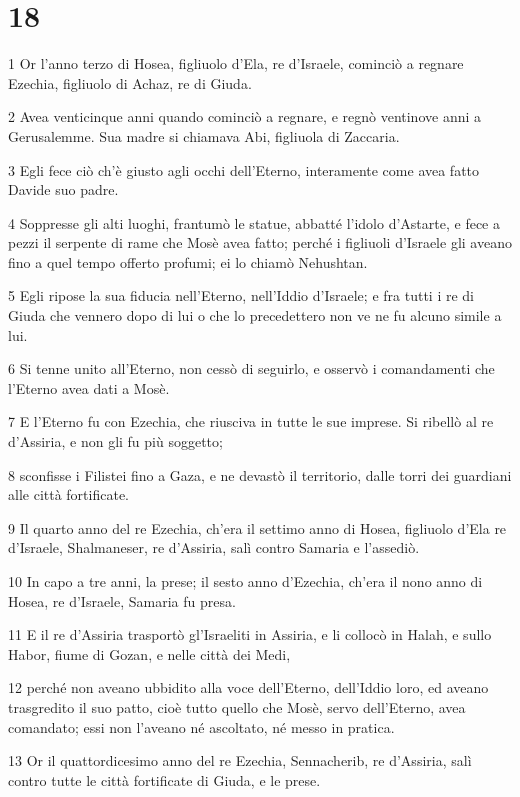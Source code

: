 \chapter{18}

\par 1 Or l'anno terzo di Hosea, figliuolo d'Ela, re d'Israele, cominciò a regnare Ezechia, figliuolo di Achaz, re di Giuda.
\par 2 Avea venticinque anni quando cominciò a regnare, e regnò ventinove anni a Gerusalemme. Sua madre si chiamava Abi, figliuola di Zaccaria.
\par 3 Egli fece ciò ch'è giusto agli occhi dell'Eterno, interamente come avea fatto Davide suo padre.
\par 4 Soppresse gli alti luoghi, frantumò le statue, abbatté l'idolo d'Astarte, e fece a pezzi il serpente di rame che Mosè avea fatto; perché i figliuoli d'Israele gli aveano fino a quel tempo offerto profumi; ei lo chiamò Nehushtan.
\par 5 Egli ripose la sua fiducia nell'Eterno, nell'Iddio d'Israele; e fra tutti i re di Giuda che vennero dopo di lui o che lo precedettero non ve ne fu alcuno simile a lui.
\par 6 Si tenne unito all'Eterno, non cessò di seguirlo, e osservò i comandamenti che l'Eterno avea dati a Mosè.
\par 7 E l'Eterno fu con Ezechia, che riusciva in tutte le sue imprese. Si ribellò al re d'Assiria, e non gli fu più soggetto;
\par 8 sconfisse i Filistei fino a Gaza, e ne devastò il territorio, dalle torri dei guardiani alle città fortificate.
\par 9 Il quarto anno del re Ezechia, ch'era il settimo anno di Hosea, figliuolo d'Ela re d'Israele, Shalmaneser, re d'Assiria, salì contro Samaria e l'assediò.
\par 10 In capo a tre anni, la prese; il sesto anno d'Ezechia, ch'era il nono anno di Hosea, re d'Israele, Samaria fu presa.
\par 11 E il re d'Assiria trasportò gl'Israeliti in Assiria, e li collocò in Halah, e sullo Habor, fiume di Gozan, e nelle città dei Medi,
\par 12 perché non aveano ubbidito alla voce dell'Eterno, dell'Iddio loro, ed aveano trasgredito il suo patto, cioè tutto quello che Mosè, servo dell'Eterno, avea comandato; essi non l'aveano né ascoltato, né messo in pratica.
\par 13 Or il quattordicesimo anno del re Ezechia, Sennacherib, re d'Assiria, salì contro tutte le città fortificate di Giuda, e le prese.
